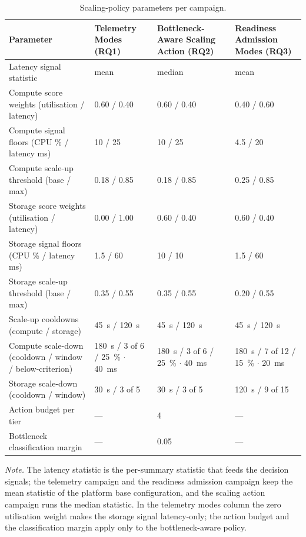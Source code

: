 ﻿\documentclass[12pt,reqno,twoside]{amsbook}
\begin{document}
{\begin{table}[H]
    \centering
    \caption{Scaling-policy parameters per campaign.}
    \label{tab:app_config_scaling}
    \footnotesize
    \setlength{\tabcolsep}{4pt}
    \begin{tabular}{p{} p{} p{} p{}}
        \toprule
        Parameter & Telemetry Modes (RQ1) & Bottleneck-Aware Scaling Action (RQ2) & Readiness Admission Modes (RQ3) \\
        \midrule
        Latency signal statistic & mean & median & mean \\
        Compute score weights (utilisation / latency) & 0.60 / 0.40 & 0.60 / 0.40 & 0.40 / 0.60 \\
        Compute signal floors (CPU \% / latency ms) & 10 / 25 & 10 / 25 & 4.5 / 20 \\
        Compute scale-up threshold (base / max) & 0.18 / 0.85 & 0.18 / 0.85 & 0.25 / 0.85 \\
        Storage score weights (utilisation / latency) & 0.00 / 1.00 & 0.60 / 0.40 & 0.60 / 0.40 \\
        Storage signal floors (CPU \% / latency ms) & 1.5 / 60 & 10 / 10 & 1.5 / 60 \\
        Storage scale-up threshold (base / max) & 0.35 / 0.55 & 0.35 / 0.55 & 0.20 / 0.55 \\
        Scale-up cooldowns (compute / storage) & 45~s / 120~s & 45~s / 120~s & 45~s / 120~s \\
        Compute scale-down (cooldown / window / below-criterion) & 180~s / 3 of 6 / 25~\% $\cdot$ 40~ms & 180~s / 3 of 6 / 25~\% $\cdot$ 40~ms & 180~s / 7 of 12 / 15~\% $\cdot$ 20~ms \\
        Storage scale-down (cooldown / window) & 30~s / 3 of 5 & 30~s / 3 of 5 & 120~s / 9 of 15 \\
        Action budget per tier & --- & 4 & --- \\
        Bottleneck classification margin & --- & 0.05 & --- \\
        \bottomrule
    \end{tabular}
\end{table}
{\footnotesize\noindent\textit{Note.} The latency statistic is the per-summary
statistic that feeds the decision signals; the telemetry campaign and the
readiness admission campaign keep the mean statistic of the platform base
configuration, and the scaling action campaign runs the median statistic. In
the telemetry modes column the zero utilisation
weight makes the storage signal latency-only; the action budget and the
classification margin apply only to the bottleneck-aware policy.\par}

}
\end{document}
